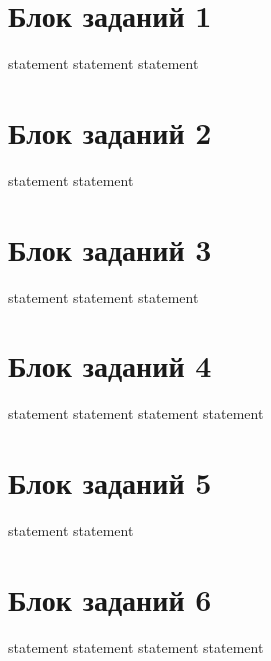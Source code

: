 \section{Блок заданий 1}

{statement}
{statement}
{statement}

\section{Блок заданий 2}

{statement}
{statement}

\section{Блок заданий 3}

{statement}
{statement}
{statement}

\section{Блок заданий 4}

{statement}
{statement}
{statement}
{statement}

\section{Блок заданий 5}

{statement}
{statement}

\section{Блок заданий 6}

{statement}
{statement}
{statement}
{statement}